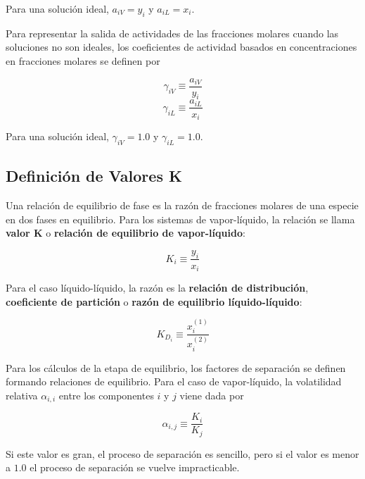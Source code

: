 \documentclass[11pt]{book}
\begin{document}
Para una solución ideal, $a_{iV} = y_i$ y $a_{iL} = x_i$.

Para representar la salida de actividades de las fracciones molares cuando las soluciones no son ideales, los coeficientes de actividad basados en concentraciones en fracciones molares se definen por

\begin{equation}
    \label{eq:PotencialQuimico_Fugacidad_10}
    \gamma_{iV} \equiv \frac{a_{iV}}{y_i}
\end{equation}
\begin{equation}
    \label{eq:PotencialQuimico_Fugacidad_11}
    \gamma_{iL} \equiv \frac{a_{iL}}{x_i}
\end{equation}

Para una solución ideal, $\gamma_{iV} = 1.0$ y $\gamma_{iL} = 1.0$.

\subsection{Definición de Valores K}

Una relación de equilibrio de fase es la razón de fracciones molares de una especie en dos fases en equilibrio. Para los sistemas de vapor-líquido, la relación se llama \textbf{valor K} o \textbf{relación de equilibrio de vapor-líquido}:

\begin{equation}
    \label{eq:DefinicionValoresK_1}
    K_i \equiv \frac{y_i}{x_i}
\end{equation}

Para el caso líquido-líquido, la razón es la \textbf{relación de distribución}, \textbf{coeficiente de partición} o \textbf{razón de equilibrio líquido-líquido}:

\begin{equation}
    \label{eq:DefinicionValoresK_2}
    K_{D_i} \equiv \frac{x_i^{(1)}}{x_i^{(2)}}
\end{equation}

Para los cálculos de la etapa de equilibrio, los factores de separación se definen formando relaciones de equilibrio. Para el caso de vapor-líquido, la volatilidad relativa $\alpha_{i,i}$ entre los componentes $i$ y $j$ viene dada por

\begin{equation}
    \label{eq:DefinicionValoresK_3}
    \alpha_{i,j} \equiv \frac{K_i}{K_j}
\end{equation}

Si este valor es gran, el proceso de separación es sencillo, pero si el valor es menor a $1.0$ el proceso de separación se vuelve impracticable.
\end{document}
